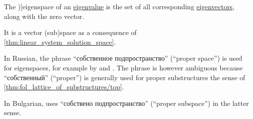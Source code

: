 \begin{definition}\label{def:eigenspace}
  The \term[ru=собственное подпространство, en=eigenspace (\cite[265]{FriedbergInselSpence2018LinearAlgebra})]{eigenspace} of an \hyperref[def:eigenpair]{eigenvalue} is the set of all corresponding \hyperref[def:eigenpair]{eigenvectors}, along with the zero vector.
\end{definition}
\begin{comments}
  \item It is a vector (sub)space as a consequence of \cref{thm:linear_system_solution_space}.

  \item In Russian, the phrase \enquote{собственное подпространство} (\enquote{proper space}) is used for eigenspaces, for example by \textcite[\S 30.2]{Тыртышников2007ЛинейнаяАлгебра} and \textcite[def. II.3]{Курош1968КурсВысшейАлгебры}. The phrase is however ambiguous because \enquote{собственный} (\enquote{proper}) is generally used for proper substructures the sense of \cref{thm:fol_lattice_of_substructures/top}.

  In Bulgarian, \textcite[101]{Обрешков1962ВисшаАлгебра} uses \enquote{собствено подпространство} (\enquote{proper subspace}) in the latter sense.
\end{comments}

